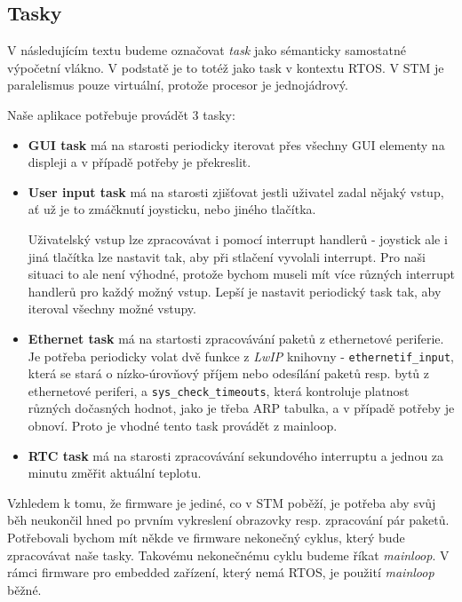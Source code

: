 \subsection{Tasky}

V následujícím textu budeme označovat \emph{task} jako sémanticky samostatné výpočetní
vlákno.
V podstatě je to totéž jako task v kontextu RTOS.
V STM je paralelismus pouze virtuální, protože procesor je jednojádrový.

Naše aplikace potřebuje provádět 3 tasky:
\begin{itemize}
  \item \textbf{GUI task} má na starosti periodicky iterovat přes všechny GUI elementy
    na displeji a v případě potřeby je překreslit.

  \item \textbf{User input task} má na starosti zjišťovat jestli uživatel zadal nějaký
    vstup, ať už je to zmáčknutí joysticku, nebo jiného tlačítka.

    Uživatelský vstup lze zpracovávat i pomocí interrupt handlerů - joystick
    ale i jiná tlačítka lze nastavit tak, aby při stlačení vyvolali interrupt.
    Pro naši situaci to ale není výhodné, protože bychom museli mít více různých
    interrupt handlerů pro každý možný vstup.
    Lepší je nastavit periodický task tak, aby iteroval všechny možné vstupy.

  \item \textbf{Ethernet task} má na startosti zpracovávání paketů z ethernetové
    periferie. Je potřeba periodicky volat dvě funkce z \textit{LwIP} knihovny -
    \texttt{ethernetif_input}, která se stará o nízko-úrovňový příjem nebo odesílání paketů resp.
    bytů z ethernetové periferi, a \texttt{sys_check_timeouts}, která kontroluje platnost různých
    dočasných hodnot, jako je třeba ARP tabulka, a v případě potřeby je obnoví.
    Proto je vhodné tento task provádět z mainloop.

  \item \textbf{RTC task} má na starosti zpracovávání sekundového interruptu a jednou za
    minutu změřit aktuální teplotu.
\end{itemize}

Vzhledem k tomu, že firmware je jediné, co v STM poběží, je potřeba aby svůj běh neukončil
hned po prvním vykreslení obrazovky resp. zpracování pár paketů.
Potřebovali bychom mít někde ve firmware nekonečný cyklus, který bude zpracovávat naše
tasky.
Takovému nekonečnému cyklu budeme říkat \emph{mainloop}.
V rámci firmware pro embedded zařízení, který nemá RTOS, je použití \emph{mainloop} běžné.

